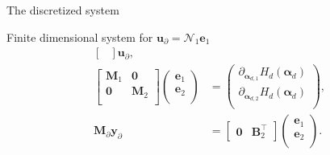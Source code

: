 \documentclass[aspectratio=169]{ISAE-Beamer}
\begin{document}
\begin{frame}{The discretized system}
{\begin{exampleblock}{Finite dimensional system for $\bm{u}_\partial = \mathcal{N}_1 \displaystyle \bm{e}_1$}
\begin{equation*}
\begin{aligned}
\begin{bmatrix}
	\end{bmatrix}
	\mathbf{u}_\partial, \\
	\begin{bmatrix}
	\mathbf{M}_1 & \mathbf{0} \\
	\mathbf{0} & \mathbf{M}_2 \\
	\end{bmatrix}
	\begin{pmatrix}
	\mathbf{e}_{1} \\
	\mathbf{e}_{2} \\
	\end{pmatrix}
	&= \begin{pmatrix}
	\partial_{\bm{\alpha}_{d, 1}} H_d(\bm{\alpha}_d)\\
	\partial_{\bm{\alpha}_{d, 2}} H_d(\bm{\alpha}_d)\\
	\end{pmatrix}, \\
	\mathbf{M}_\partial {\mathbf{y}_\partial} &= 
	\begin{bmatrix}
	\mathbf{0} & \mathbf{B}_2^\top 
	\end{bmatrix}\begin{pmatrix}
	\mathbf{e}_{1} \\
	\mathbf{e}_{2} \\
	\end{pmatrix}.
	\end{aligned}
	\end{equation*}
\end{exampleblock}


}


\end{frame}
\end{document}
